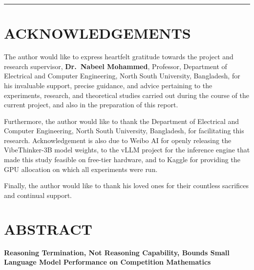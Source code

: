 \documentclass[12pt,a4paper,oneside]{report}
\begin{document}
\vspace{10pt}
\rule{7cm}{0.4pt}

\chapter*{ACKNOWLEDGEMENTS}

The author would like to express heartfelt gratitude towards the project and
research supervisor, \textbf{Dr.\ Nabeel Mohammed}, Professor, Department of
Electrical and Computer Engineering, North South University, Bangladesh, for
his invaluable support, precise guidance, and advice pertaining to the
experiments, research, and theoretical studies carried out during the course of
the current project, and also in the preparation of this report.

Furthermore, the author would like to thank the Department of Electrical and
Computer Engineering, North South University, Bangladesh, for facilitating this
research. Acknowledgement is also due to Weibo AI for openly releasing the
VibeThinker-3B model weights, to the vLLM project for the inference engine that
made this study feasible on free-tier hardware, and to Kaggle for providing the
GPU allocation on which all experiments were run.

Finally, the author would like to thank his loved ones for their countless
sacrifices and continual support.

\chapter*{ABSTRACT}

\begin{center}
\textbf{Reasoning Termination, Not Reasoning Capability, Bounds Small Language
Model Performance on Competition Mathematics}
\end{center}
\end{document}
